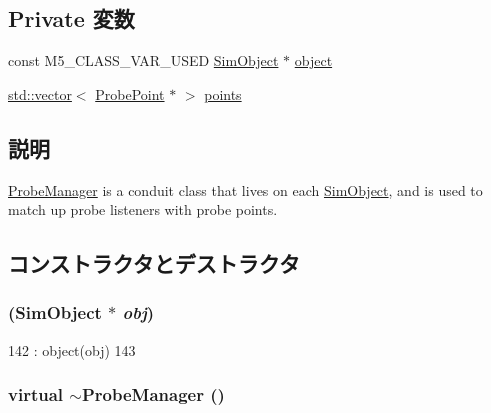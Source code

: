 \subsection*{Private 変数}
\begin{DoxyCompactItemize}
\item 
const M5\_\-CLASS\_\-VAR\_\-USED \hyperlink{classSimObject}{SimObject} $\ast$ \hyperlink{classProbeManager_ad7b766250212156ad2c446f0b0522186}{object}
\item 
\hyperlink{classstd_1_1vector}{std::vector}$<$ \hyperlink{classProbePoint}{ProbePoint} $\ast$ $>$ \hyperlink{classProbeManager_acfbbc709561ad2af0b0ce4b78ce29458}{points}
\end{DoxyCompactItemize}


\subsection{説明}
\hyperlink{classProbeManager}{ProbeManager} is a conduit class that lives on each \hyperlink{classSimObject}{SimObject}, and is used to match up probe listeners with probe points. 

\subsection{コンストラクタとデストラクタ}
\hypertarget{classProbeManager_ada1bd1d8f7a1eb066d7770a38ecb608d}{
\subsubsection[{ProbeManager}]{ ({\bf SimObject} $\ast$ {\em obj})}}
\label{classProbeManager_ada1bd1d8f7a1eb066d7770a38ecb608d}



\begin{DoxyCode}
142         : object(obj)
143     {}
\end{DoxyCode}
\hypertarget{classProbeManager_a18e6749a51789dfcbf2703e4f91ebe9f}{
\subsubsection[{$\sim$ProbeManager}]{\setlength{\rightskip}{0pt plus 5cm}virtual $\sim${\bf ProbeManager} ()}}
\label{classProbeManager_a18e6749a51789dfcbf2703e4f91ebe9f}



